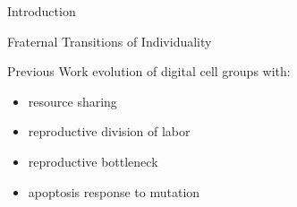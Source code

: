 \begin{block}{Introduction}

\begin{alertblock}{Fraternal Transitions of Individuality}

\end{alertblock}

\begin{alertblock}{Previous Work}
\vspace{1ex}
evolution of digital cell groups with:
\begin{itemize}
\item resource sharing
\item reproductive division of labor
\item reproductive bottleneck
\item apoptosis response to mutation
\end{itemize}



\end{alertblock}


\end{block}

